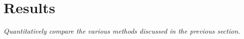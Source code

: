 
\chapter{Results}

\textit{Quantitatively compare the various methods discussed in the previous
section.}
